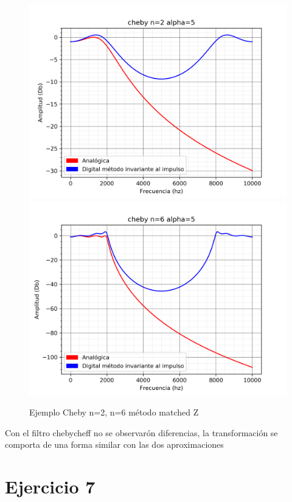 \documentclass[assd_guia_filtros_recursivos_main.tex]{subfiles}
\begin{document}
\begin{figure}[H]	
	\centering
	\includegraphics[scale=0.4]{output/cheby_matched_z/alpha=5/cheby_n=2.png}
	\includegraphics[scale=0.4]{output/cheby_matched_z/alpha=5/cheby_n=6.png}
	\caption{Ejemplo Cheby n=2, n=6 método matched Z}
	\label{fig:Caso 4}
\end{figure}

Con el filtro chebycheff no se observarón diferencias, la transformación se comporta de una forma similar con las dos aproximaciones

\section{Ejercicio 7}
\end{document}
